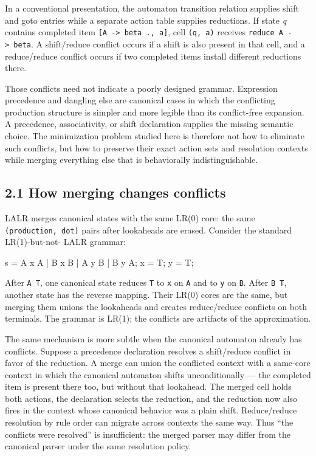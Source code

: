 \documentclass[
  10pt,
]{article}
\newenvironment{Shaded}{}{}
\newcommand{\NormalTok}[1]{#1}
\begin{document}
In a conventional presentation, the automaton transition relation
supplies shift and goto entries while a separate action table supplies
reductions. If state \emph{q} contains completed item
\texttt{{[}A\ -\textgreater{}\ beta\ .,\ a{]}}, cell \texttt{(q,\ a)}
receives \texttt{reduce\ A\ -\textgreater{}\ beta}. A shift/reduce
conflict occurs if a shift is also present in that cell, and a
reduce/reduce conflict occurs if two completed items install different
reductions there.

Those conflicts need not indicate a poorly designed grammar. Expression
precedence and dangling else are canonical cases in which the
conflicting production structure is simpler and more legible than its
conflict-free expansion. A precedence, associativity, or shift
declaration supplies the missing semantic choice. The minimization
problem studied here is therefore not how to eliminate such conflicts,
but how to preserve their exact action sets and resolution contexts while
merging everything else that is behaviorally indistinguishable.

\hypertarget{21-how-merging-changes-conflicts}{%
\subsection{2.1 How merging changes
conflicts}\label{21-how-merging-changes-conflicts}}

LALR merges canonical states with the same LR(0) core: the same
\texttt{(production,\ dot)} pairs after lookaheads are erased. Consider
the standard LR(1)-but-not- LALR grammar:

\begin{Shaded}
\begin{Highlighting}[]
\NormalTok{s = A x A | B x B | A y B | B y A;}
\NormalTok{x = T;}
\NormalTok{y = T;}
\end{Highlighting}
\end{Shaded}

After \texttt{A\ T}, one canonical state reduces \texttt{T} to
\texttt{x} on \texttt{A} and to \texttt{y} on \texttt{B}. After
\texttt{B\ T}, another state has the reverse mapping. Their LR(0) cores
are the same, but merging them unions the lookaheads and creates
reduce/reduce conflicts on both terminals. The grammar is LR(1); the
conflicts are artifacts of the approximation.

The same mechanism is more subtle when the canonical automaton already
has conflicts. Suppose a precedence declaration resolves a shift/reduce
conflict in favor of the reduction. A merge can union the conflicted
context with a same-core context in which the canonical automaton shifts
unconditionally --- the completed item is present there too, but without
that lookahead. The merged cell holds both actions, the declaration
selects the reduction, and the reduction now also fires in the context
whose canonical behavior was a plain shift. Reduce/reduce resolution by
rule order can migrate across contexts the same way. Thus ``the
conflicts were resolved'' is insufficient: the merged parser may differ
from the canonical parser under the same resolution policy.
\end{document}
